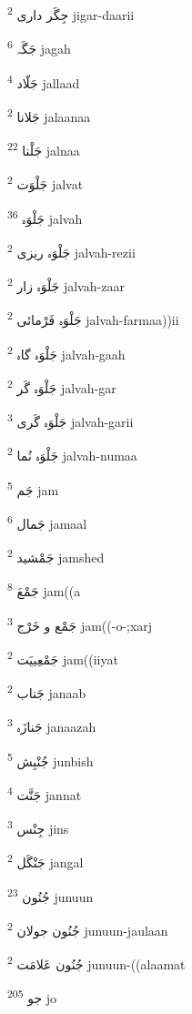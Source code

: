 \documentclass[12pt]{article}
\begin{document}
\begin{RTL}
\begin{multicols}{5}
{\ur جِگَر داری}   \textsuperscript{2} jigar-daarii

{\ur جَگَہ}   \textsuperscript{6} jagah

{\ur جَلّاد}   \textsuperscript{4} jallaad

{\ur جَلانا}   \textsuperscript{2} jalaanaa

{\ur جَلْنا}   \textsuperscript{22} jalnaa

{\ur جَلْوَت}   \textsuperscript{2} jalvat

{\ur جَلْوَہ}   \textsuperscript{36} jalvah

{\ur جَلْوَہ ریزی}   \textsuperscript{2} jalvah-rezii

{\ur جَلْوَہ زار}   \textsuperscript{2} jalvah-zaar

{\ur جَلْوَہ فَرْمائی}   \textsuperscript{2} jalvah-farmaa))ii

{\ur جَلْوَہ گاہ}   \textsuperscript{2} jalvah-gaah

{\ur جَلْوَہ گَر}   \textsuperscript{2} jalvah-gar

{\ur جَلْوَہ گَری}   \textsuperscript{3} jalvah-garii

{\ur جَلْوَہ نُما}   \textsuperscript{2} jalvah-numaa

{\ur جَم}   \textsuperscript{5} jam

{\ur جَمال}   \textsuperscript{6} jamaal

{\ur جَمْشید}   \textsuperscript{2} jamshed

{\ur جَمْعَ}   \textsuperscript{8} jam((a

{\ur جَمْع و خَرْج}   \textsuperscript{3} jam((-o-;xarj

{\ur جَمْعِییَت}   \textsuperscript{2} jam((iiyat

{\ur جَناب}   \textsuperscript{2} janaab

{\ur جَنازَہ}   \textsuperscript{3} janaazah

{\ur جُنْبِش}   \textsuperscript{5} junbish

{\ur جَنَّت}   \textsuperscript{4} jannat

{\ur جِنْس}   \textsuperscript{3} jins

{\ur جَنْگَل}   \textsuperscript{2} jangal

{\ur جُنُون}   \textsuperscript{23} junuun

{\ur جُنُون جولان}   \textsuperscript{2} junuun-jaulaan

{\ur جُنُون عَلامَت}   \textsuperscript{2} junuun-((alaamat

{\ur جو}   \textsuperscript{205} jo


\end{multicols}
\end{RTL}
\end{document}
